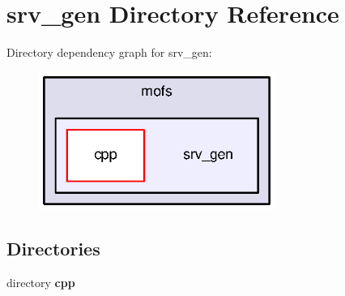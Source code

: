 \section{srv\-\_\-gen Directory Reference}
\label{dir_1ccc3397d55d8b1f9ea62a107a338bcb}
Directory dependency graph for srv\-\_\-gen\-:\nopagebreak
\begin{figure}[H]
\begin{center}
\leavevmode
\includegraphics[width=218pt]{dir_1ccc3397d55d8b1f9ea62a107a338bcb_dep}
\end{center}
\end{figure}
\subsection*{Directories}
\begin{DoxyCompactItemize}
\item 
directory {\bf cpp}
\end{DoxyCompactItemize}
